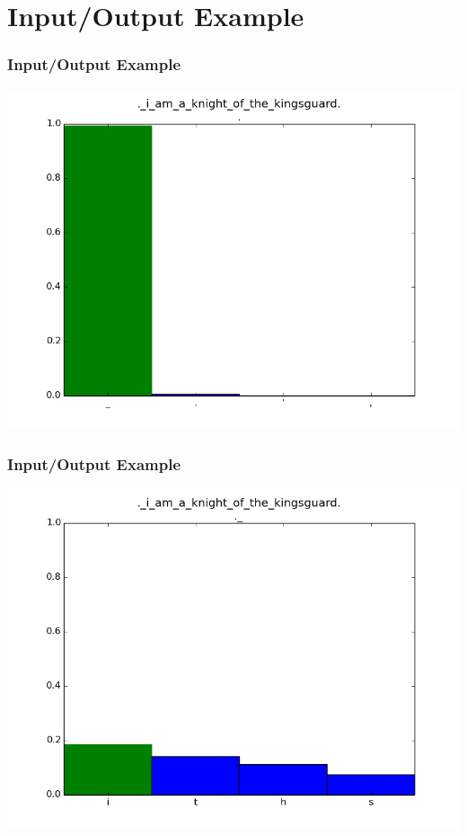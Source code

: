 \documentclass[12]{beamer}
\begin{document}
\section{Input/Output Example}
\begin{frame}
\frametitle{Input/Output Example}
\begin{center}
\includegraphics[scale=0.4]{../distplot/00.png}
\end{center}
\end{frame}

\begin{frame}
\frametitle{Input/Output Example}
\begin{center}
\includegraphics[scale=0.4]{../distplot/01.png}
\end{center}
\end{frame}
\end{document}
